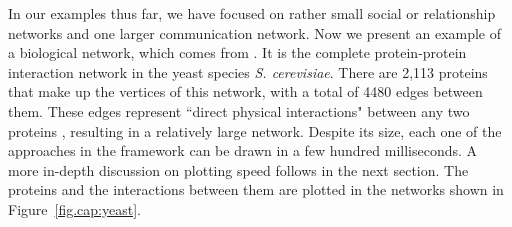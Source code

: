 % 
In our examples thus far, we have focused on rather small social or relationship networks and one larger communication network. Now we present an example of a biological network, which comes from \citet{protein}. It is the complete protein-protein interaction network in the yeast species \emph{S. cerevisiae}. There are 2,113 proteins that make up the vertices of this network, with a total of 4480 edges between them.  These edges represent ``direct physical interactions" between any two proteins \citep[][p. 42]{protein}, resulting in a relatively large  network. Despite its size, each one of the approaches in the  framework can be drawn in a few hundred milliseconds. A more in-depth discussion on plotting speed follows in the next section. The proteins and the interactions between them are plotted in the networks shown in Figure~\ref{fig.cap:yeast}. %
